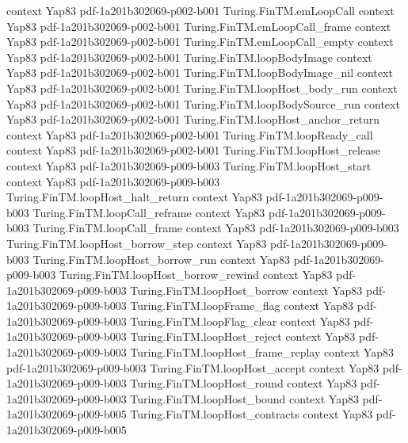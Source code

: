 \begin{theorem}
  {context}
  {Yap83}
  {pdf-1a201b302069-p002-b001}
\proofstep
  {Turing.FinTM.emLoopCall}
  {context}
  {Yap83}
  {pdf-1a201b302069-p002-b001}
\proofstep
  {Turing.FinTM.emLoopCall_frame}
  {context}
  {Yap83}
  {pdf-1a201b302069-p002-b001}
\proofstep
  {Turing.FinTM.emLoopCall_empty}
  {context}
  {Yap83}
  {pdf-1a201b302069-p002-b001}
\proofstep
  {Turing.FinTM.loopBodyImage}
  {context}
  {Yap83}
  {pdf-1a201b302069-p002-b001}
\proofstep
  {Turing.FinTM.loopBodyImage_nil}
  {context}
  {Yap83}
  {pdf-1a201b302069-p002-b001}
\proofstep
  {Turing.FinTM.loopHost_body_run}
  {context}
  {Yap83}
  {pdf-1a201b302069-p002-b001}
\proofstep
  {Turing.FinTM.loopBodySource_run}
  {context}
  {Yap83}
  {pdf-1a201b302069-p002-b001}
\proofstep
  {Turing.FinTM.loopHost_anchor_return}
  {context}
  {Yap83}
  {pdf-1a201b302069-p002-b001}
\proofstep
  {Turing.FinTM.loopReady_call}
  {context}
  {Yap83}
  {pdf-1a201b302069-p002-b001}
\proofstep
  {Turing.FinTM.loopHost_release}
  {context}
  {Yap83}
  {pdf-1a201b302069-p009-b003}
\proofstep
  {Turing.FinTM.loopHost_start}
  {context}
  {Yap83}
  {pdf-1a201b302069-p009-b003}
\proofstep
  {Turing.FinTM.loopHost_halt_return}
  {context}
  {Yap83}
  {pdf-1a201b302069-p009-b003}
\proofstep
  {Turing.FinTM.loopCall_reframe}
  {context}
  {Yap83}
  {pdf-1a201b302069-p009-b003}
\proofstep
  {Turing.FinTM.loopCall_frame}
  {context}
  {Yap83}
  {pdf-1a201b302069-p009-b003}
\proofstep
  {Turing.FinTM.loopHost_borrow_step}
  {context}
  {Yap83}
  {pdf-1a201b302069-p009-b003}
\proofstep
  {Turing.FinTM.loopHost_borrow_run}
  {context}
  {Yap83}
  {pdf-1a201b302069-p009-b003}
\proofstep
  {Turing.FinTM.loopHost_borrow_rewind}
  {context}
  {Yap83}
  {pdf-1a201b302069-p009-b003}
\proofstep
  {Turing.FinTM.loopHost_borrow}
  {context}
  {Yap83}
  {pdf-1a201b302069-p009-b003}
\proofstep
  {Turing.FinTM.loopFrame_flag}
  {context}
  {Yap83}
  {pdf-1a201b302069-p009-b003}
\proofstep
  {Turing.FinTM.loopFlag_clear}
  {context}
  {Yap83}
  {pdf-1a201b302069-p009-b003}
\proofstep
  {Turing.FinTM.loopHost_reject}
  {context}
  {Yap83}
  {pdf-1a201b302069-p009-b003}
\proofstep
  {Turing.FinTM.loopHost_frame_replay}
  {context}
  {Yap83}
  {pdf-1a201b302069-p009-b003}
\proofstep
  {Turing.FinTM.loopHost_accept}
  {context}
  {Yap83}
  {pdf-1a201b302069-p009-b003}
\proofstep
  {Turing.FinTM.loopHost_round}
  {context}
  {Yap83}
  {pdf-1a201b302069-p009-b003}
\proofstep
  {Turing.FinTM.loopHost_bound}
  {context}
  {Yap83}
  {pdf-1a201b302069-p009-b005}
\proofstep
  {Turing.FinTM.loopHost_contracts}
  {context}
  {Yap83}
  {pdf-1a201b302069-p009-b005}

\end{theorem}
